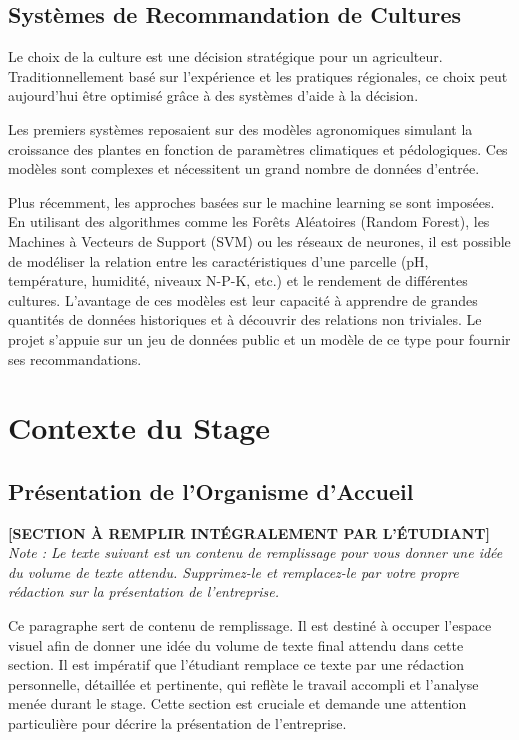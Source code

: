 \documentclass[12pt, a4paper]{report}
\begin{document}
\section{Systèmes de Recommandation de Cultures}
Le choix de la culture est une décision stratégique pour un agriculteur. Traditionnellement basé sur l'expérience et les pratiques régionales, ce choix peut aujourd'hui être optimisé grâce à des systèmes d'aide à la décision.

Les premiers systèmes reposaient sur des modèles agronomiques simulant la croissance des plantes en fonction de paramètres climatiques et pédologiques. Ces modèles sont complexes et nécessitent un grand nombre de données d'entrée.

Plus récemment, les approches basées sur le machine learning se sont imposées. En utilisant des algorithmes comme les Forêts Aléatoires (Random Forest), les Machines à Vecteurs de Support (SVM) ou les réseaux de neurones, il est possible de modéliser la relation entre les caractéristiques d'une parcelle (pH, température, humidité, niveaux N-P-K, etc.) et le rendement de différentes cultures. L'avantage de ces modèles est leur capacité à apprendre de grandes quantités de données historiques et à découvrir des relations non triviales. Le projet s'appuie sur un jeu de données public et un modèle de ce type pour fournir ses recommandations.

\chapter{Contexte du Stage}
\section{Présentation de l'Organisme d'Accueil}
\textbf{[SECTION À REMPLIR INTÉGRALEMENT PAR L'ÉTUDIANT]}
\newline
\textit{Note : Le texte suivant est un contenu de remplissage pour vous donner une idée du volume de texte attendu. Supprimez-le et remplacez-le par votre propre rédaction sur la présentation de l'entreprise.}

Ce paragraphe sert de contenu de remplissage. Il est destiné à occuper l'espace visuel afin de donner une idée du volume de texte final attendu dans cette section. Il est impératif que l'étudiant remplace ce texte par une rédaction personnelle, détaillée et pertinente, qui reflète le travail accompli et l'analyse menée durant le stage. Cette section est cruciale et demande une attention particulière pour décrire la présentation de l'entreprise.
\end{document}
